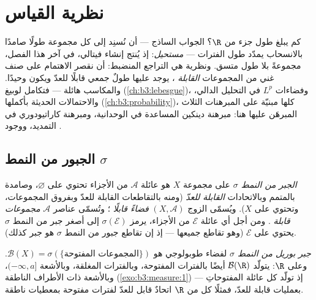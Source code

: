 \chapter{نظرية القياس}\label{ch:b3:measure}

كم يبلغ طول جزء من $\R$؟ الجواب الساذج --- أن نُسنِد إلى كل
مجموعة طولًا صامدًا بالانسحاب يمدّد طول الفترات --- \emph{مستحيل}:
إذ يُنتج إنشاء فيتالي، في آخر هذا الفصل، مجموعةً بلا طول متسق.
ونظرية  هي التراجع المنضبط: أن نقصر الاهتمام على صنف غني من
المجموعات \emph{القابلة }، يوجد عليها طولٌ جمعي قابلًا للعدّ
ويكون وحيدًا. والمكاسب هائلة --- فتكامل لوبيغ (\cref{ch:b3:lebesgue})، وفضاءات
$L^p$ في التحليل الدالي، والاحتمالات الحديثة بأكملها (\cref{ch:b3:probability})،
كلها مبنيّة على المبرهنات الثلاث المبرهَن عليها هنا: مبرهنة
دينكين المساعدة في الوحدانية، ومبرهنة كاراتيودوري في التمديد،
ووجود .

\section{الجبور من النمط $\sigma$}

\begin{definition}\label{def:b3:measure:sigmaalgebra}
\emph{الجبر من النمط $\sigma$} على
مجموعة $X$ هو عائلة $\mathcal A$ من الأجزاء تحتوي على
$\varnothing$، وصامدة بالمتمم وبالاتحادات \emph{القابلة للعدّ} (ومنه
بالتقاطعات القابلة للعدّ وبفروق المجموعات، وتحتوي على $X$). ويُسمّى
الزوج $(X, \mathcal A)$ \emph{فضاءً قابلًا }؛ وتُسمّى عناصر
$\mathcal A$ \emph{مجموعات قابلة }. ومن أجل أي عائلة
$\mathcal E$ من الأجزاء، يرمز $\sigma(\mathcal E)$ إلى أصغر جبر من النمط
$\sigma$ يحتوي على $\mathcal E$ (وهو تقاطع جميعها --- إذ إن تقاطع
جبور من النمط $\sigma$ هو جبر كذلك).
\end{definition}

\begin{definition}\label{def:b3:measure:borel}
\emph{جبر بوريل من النمط $\sigma$} لفضاء طوبولوجي هو $\mathcal B(X) = \sigma(\{\text{المجموعات المفتوحة}\})$. وعلى $\R$:
يتولّد $\mathcal B(\R)$ أيضًا بالفترات المفتوحة، وبالفترات
المغلقة، وبالأشعة $(-\infty, a]$، وبالأشعة ذات الأطراف الناطقة
(\cref{exo:b3:measure:1}) --- إذ تولّد كل عائلة المفتوحاتِ بعمليات قابلة للعدّ،
فمثلًا كل  من $\R$ اتحادٌ قابل للعدّ لفترات مفتوحة
بمعطيات ناطقة.
\end{definition}

